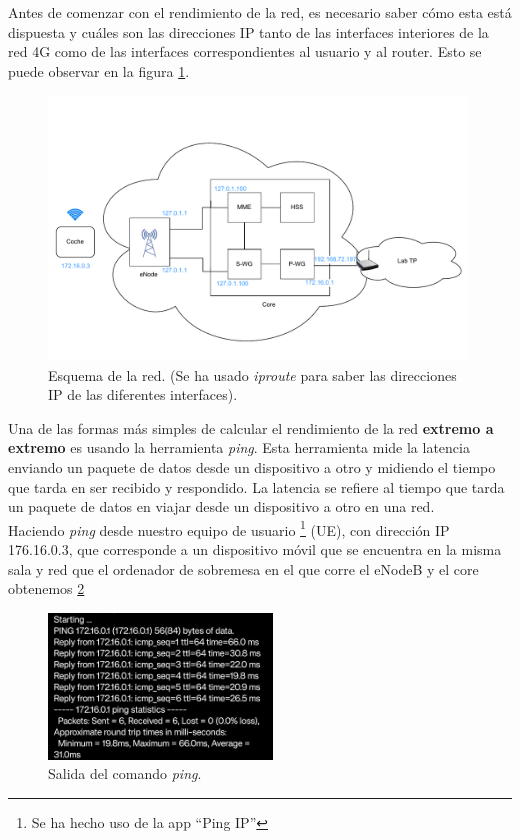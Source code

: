 Antes de comenzar con el rendimiento de la red, es necesario saber cómo esta está dispuesta  y cuáles son las direcciones IP tanto de las interfaces interiores de la red 4G como de las interfaces correspondientes al usuario y al router. Esto se puede observar en la figura \ref{fig:EsquemaRed}.

\begin{figure}[H]
    \centering
    \includegraphics[width=0.99\textwidth]{Imagenes/Solucion/10.pdf}
    \caption{Esquema de la red. (Se ha usado \textit{iproute} para saber las direcciones IP de las diferentes interfaces).}
    \label{fig:EsquemaRed}
\end{figure}

Una de las formas más simples de calcular el rendimiento de la red \textbf{extremo a extremo} es usando la herramienta \textit{ping}. Esta herramienta mide la latencia enviando un paquete de datos desde un dispositivo a otro y midiendo el tiempo que tarda en ser recibido y respondido. La latencia se refiere al tiempo que tarda un paquete de datos en viajar desde un dispositivo a otro en una red.\\
Haciendo \textit{ping} desde nuestro equipo de usuario \footnote{Se ha hecho uso de la app “Ping IP”} (UE), con dirección IP 176.16.0.3, que corresponde a un dispositivo móvil  que se encuentra en la misma sala y red que el ordenador de sobremesa en el que corre el eNodeB y el core obtenemos \ref{fig:ping} 

 \begin{figure}[H]
    \centering
    \includegraphics[width=0.53\textwidth]{Imagenes/Rendimiento/ping.jpeg}
    \caption{Salida del comando \textit{ping}.}
    \label{fig:ping}
\end{figure}

